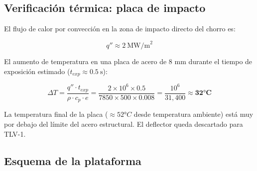 \documentclass[11pt, a4paper]{article}
\begin{document}
\subsection{Verificaci\'{o}n t\'{e}rmica: placa de impacto}

El flujo de calor por convecci\'{o}n en la zona de impacto directo del chorro es:

\begin{equation}
  q'' \approx 2\ \text{MW/m}^2
\end{equation}

El aumento de temperatura en una placa de acero de 8 mm durante el tiempo de exposici\'{o}n estimado ($t_{exp} \approx 0.5\ \text{s}$):

\begin{equation}
  \Delta T = \frac{q'' \cdot t_{exp}}{\rho \cdot c_p \cdot e}
  = \frac{2 \times 10^6 \times 0.5}{7850 \times 500 \times 0.008}
  = \frac{10^6}{31{,}400} \approx \mathbf{32°C}
\end{equation}

La temperatura final de la placa ($\approx 52°C$ desde temperatura ambiente) est\'{a} muy por debajo del l\'{i}mite del acero estructural. El deflector queda descartado para TLV-1.

\subsection{Esquema de la plataforma}
\end{document}
